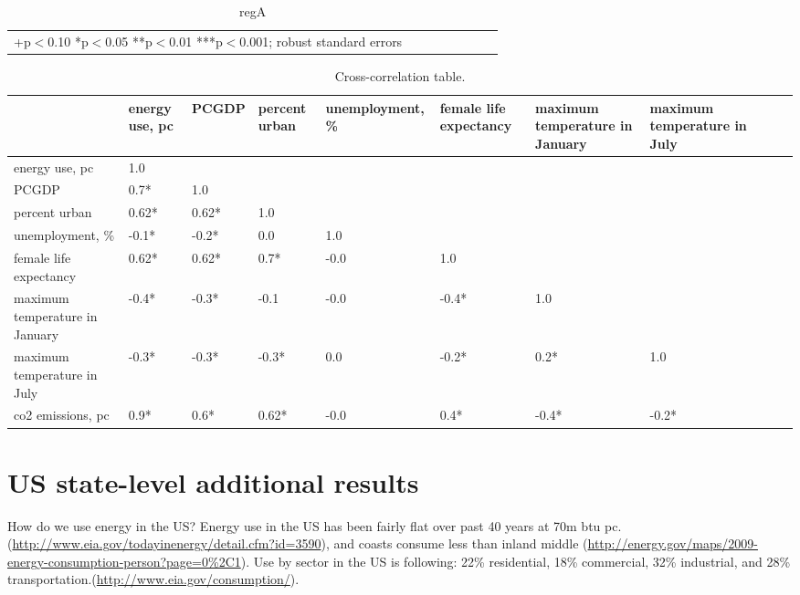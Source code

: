 \documentclass[10pt, letterpaper]{article}
\begin{document}
\begin{spacing}{1.0}
\begin{table}[H]\centering \caption{regA} \label{regA} \begin{scriptsize} \begin{tabular}{p{1.4in}p{.43in}p{.43in}p{.43in}p{.43in}p{.43in}p{.43in}p{.43in}p{.43in}p{.43in}p{.43 in}p{.43in}p{.43 in}}\hline  \hline\multicolumn{6}{l}{+p$<$0.10 *p$<$0.05 **p$<$0.01 ***p$<$0.001; robust standard errors} \end{tabular}\end{scriptsize}\end{table}

\begin{table}[h!]
  \centering\begin{scriptsize}
  \begin{tabular}{lp{.62in}p{.62in}p{.62in}p{.62in}p{.62in}p{.62in}p{.62in}p{.62in}p{.62in}p{.62in}}
             &   energy use, pc &  PCGDP &  percent urban &  unemployment, \% &  female life expectancy & maximum temperature in January& maximum temperature in July&\\\hline
         energy use, pc &   1.0 &      &      &     &       &       &       &\\
         PCGDP &   0.7*&  1.0 &      &     &       &       &       &\\
         percent urban &   0.62*&  0.62*&  1.0 &     &       &       &       &\\
          unemployment, \% &  -0.1*& -0.2*&  0.0 &  1.0&       &       &       &\\
        female life expectancy &   0.62*&  0.62*&  0.7*& -0.0&   1.0 &       &       &\\
      maximum temperature in January &  -0.4*& -0.3*& -0.1 & -0.0&  -0.4*&  1.0  &       &\\
      maximum temperature in July &  -0.3*& -0.3*& -0.3*&  0.0&  -0.2*&  0.2* & 1.0   &\\ 
         co2 emissions, pc &   0.9*&  0.6*&  0.62*& -0.0&   0.4*& -0.4* &-0.2*  &\\
  \end{tabular}\end{scriptsize}
  \caption{Cross-correlation table.}
  \label{ccTab}
\end{table}


\section{US state-level additional results}
How do we use energy in the US? %
Energy use in the US has been fairly flat over past 40 years at 70m btu
pc.(\url{http://www.eia.gov/todayinenergy/detail.cfm?id=3590}), and coasts consume
less than inland middle
(\url{http://energy.gov/maps/2009-energy-consumption-person?page=0%2C1}). 
Use by sector in the US is following: 22\% residential, 18\% commercial, 32\% industrial, and
28\% transportation.(\url{http://www.eia.gov/consumption/}). 



\end{spacing}
\end{document}
